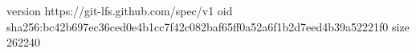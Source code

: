 version https://git-lfs.github.com/spec/v1
oid sha256:bc42b697ec36ced0e4b1cc7f42c082baf65ff0a52a6f1b2d7eed4b39a52221f0
size 262240
